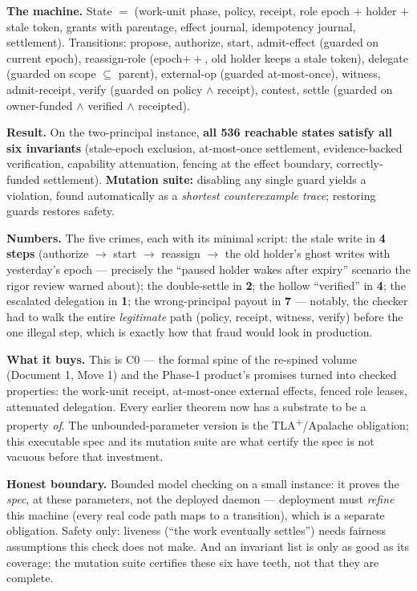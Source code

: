 \documentclass[11pt,a4paper]{article}
\begin{document}
\begin{thebox}
\textbf{The machine.} State $=$ (work-unit phase, policy, receipt, role epoch $+$ holder $+$ stale token, grants with parentage, effect journal, idempotency journal, settlement). Transitions: propose, authorize, start, admit-effect (guarded on current epoch), reassign-role (epoch$++$, old holder keeps a stale token), delegate (guarded on scope $\subseteq$ parent), external-op (guarded at-most-once), witness, admit-receipt, verify (guarded on policy $\wedge$ receipt), contest, settle (guarded on owner-funded $\wedge$ verified $\wedge$ receipted).

\textbf{Result.} On the two-principal instance, \textbf{all 536 reachable states satisfy all six invariants} (stale-epoch exclusion, at-most-once settlement, evidence-backed verification, capability attenuation, fencing at the effect boundary, correctly-funded settlement). \textbf{Mutation suite:} disabling any single guard yields a violation, found automatically as a \emph{shortest counterexample trace}; restoring guards restores safety.
\end{thebox}

\textbf{Numbers.} The five crimes, each with its minimal script: the stale write in \textbf{4 steps} (authorize $\to$ start $\to$ reassign $\to$ the old holder's ghost writes with yesterday's epoch --- precisely the ``paused holder wakes after expiry'' scenario the rigor review warned about); the double-settle in \textbf{2}; the hollow ``verified'' in \textbf{4}; the escalated delegation in \textbf{1}; the wrong-principal payout in \textbf{7} --- notably, the checker had to walk the entire \emph{legitimate} path (policy, receipt, witness, verify) before the one illegal step, which is exactly how that fraud would look in production.

\textbf{What it buys.} This is C0 --- the formal spine of the re-spined volume (Document 1, Move 1) and the Phase-1 product's promises turned into checked properties: the work-unit receipt, at-most-once external effects, fenced role leases, attenuated delegation. Every earlier theorem now has a substrate to be a property \emph{of}. The unbounded-parameter version is the TLA\textsuperscript{+}/Apalache obligation; this executable spec and its mutation suite are what certify the spec is not vacuous before that investment.

\begin{boundary}
\textbf{Honest boundary.} Bounded model checking on a small instance: it proves the \emph{spec}, at these parameters, not the deployed daemon --- deployment must \emph{refine} this machine (every real code path maps to a transition), which is a separate obligation. Safety only: liveness (``the work eventually settles'') needs fairness assumptions this check does not make. And an invariant list is only as good as its coverage; the mutation suite certifies these six have teeth, not that they are complete.
\end{boundary}
\end{document}
